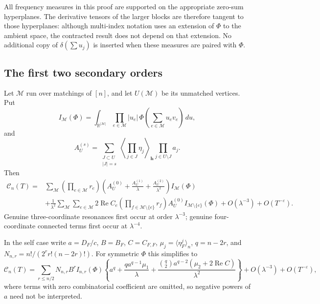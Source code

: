 \documentclass[11pt]{article}
\numberwithin{equation}{section}
\theoremstyle{remark}
\begin{document}
All frequency measures in this proof are supported on the appropriate
zero-sum hyperplanes. The derivative tensors of the larger blocks are
therefore tangent to those hyperplanes: although multi-index notation
uses an extension of $\Phi$ to the ambient space, the contracted result
does not depend on that extension. No additional copy of
$\delta(\sum u_j)$ is inserted when these measures are paired with
$\Phi$.


\subsection{The first two secondary orders}
Let $\mathcal M$ run over matchings of $[n]$, and let $U(\mathcal M)$
be its unmatched vertices. Put
\[
 I_{\mathcal M}(\Phi)=\int_{\mathbb R^{|\mathcal M|}}
 \prod_{e\in\mathcal M}|u_e|\,
 \Phi\left(\sum_{e\in\mathcal M}u_ev_e\right)\,du,
\]
and
\[
 A_U^{(s)}=\sum_{\substack{J\subset U\\|J|=s}}
 \left\langle\prod_{j\in J}\eta_j\right\rangle_{\boldsymbol h}
 \prod_{j\in U\setminus J}a_j.
\]
Then
\begin{align*}
 \mathcal C_n(T)={}&
 \sum_{\mathcal M}\left(\prod_{e\in\mathcal M}r_e\right)
 \left(A_U^{(0)}+\frac{A_U^{(1)}}\lambda+
                    \frac{A_U^{(2)}}{\lambda^2}\right)I_{\mathcal M}(\Phi)\\
 &+\frac1{\lambda^2}\sum_{\mathcal M}\sum_{e\in\mathcal M}
 2\operatorname{Re}C_e\left(\prod_{f\in\mathcal M\setminus\{e\}}r_f\right)
 A_U^{(0)}I_{\mathcal M\setminus\{e\}}(\Phi)
 +O(\lambda^{-3})+O(T^{-\varepsilon}).
\end{align*}
Genuine three-coordinate resonances first occur at order $\lambda^{-3}$;
genuine four-coordinate connected terms first occur at $\lambda^{-4}$.

In the self case write $a=D_F/c$, $B=B_F$, $C=C_{F,F}$,
$\mu_j=\langle\eta_F^j\rangle_n$, $q=n-2r$, and
$N_{n,r}=n!/(2^rr!(n-2r)!)$. For symmetric $\Phi$ this simplifies to
\[
 \mathcal C_n(T)=\sum_{r\le n/2}N_{n,r}B^rI_{n,r}(\Phi)
 \left\{a^q+\frac{qa^{q-1}\mu_1}\lambda
 +\frac{\binom q2a^{q-2}(\mu_2+2\operatorname{Re}C)}{\lambda^2}\right\}
 +O(\lambda^{-3})+O(T^{-\varepsilon}),
\]
where terms with zero combinatorial coefficient are omitted, so negative
powers of $a$ need not be interpreted.
\end{document}
